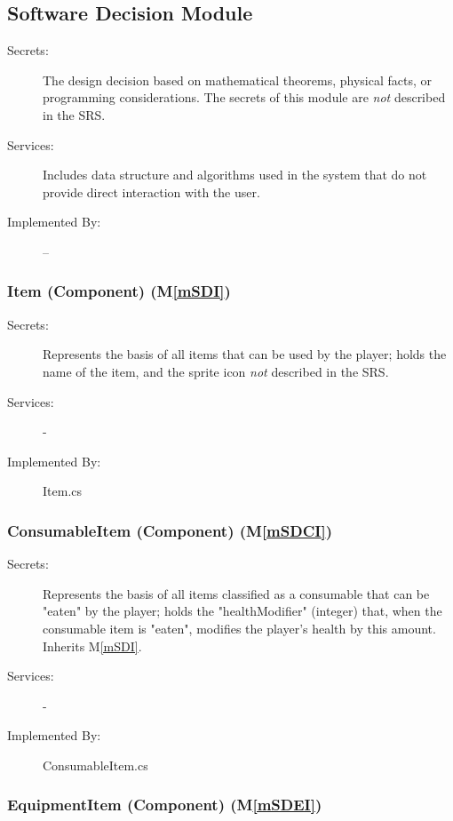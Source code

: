 \documentclass[12pt, titlepage]{article}
\newcommand{\mref}[1]{M\ref{#1}}
\begin{document}
\subsection{Software Decision Module}

\begin{description}
\item[Secrets:] The design decision based on mathematical theorems, physical
  facts, or programming considerations. The secrets of this module are
  \emph{not} described in the SRS.
\item[Services:] Includes data structure and algorithms used in the system that
  do not provide direct interaction with the user. 
\item[Implemented By:] --
\end{description}

\subsubsection{Item (Component) (\mref{mSDI})}

\begin{description}
\item[Secrets:] Represents the basis of all items that can be used by the player; holds the name of the item, and the sprite icon
  \emph{not} described in the SRS.
\item[Services:] -
\item[Implemented By:] Item.cs
\end{description}

\subsubsection{ConsumableItem (Component) (\mref{mSDCI})}

\begin{description}
\item[Secrets:] Represents the basis of all items classified as a consumable that can be "eaten" by the player; holds the "healthModifier" (integer) that, when the consumable item is "eaten", modifies the player's health by this amount. Inherits \mref{mSDI}.
\item[Services:] -
\item[Implemented By:] ConsumableItem.cs
\end{description}

\subsubsection{EquipmentItem (Component) (\mref{mSDEI})}
\end{document}
